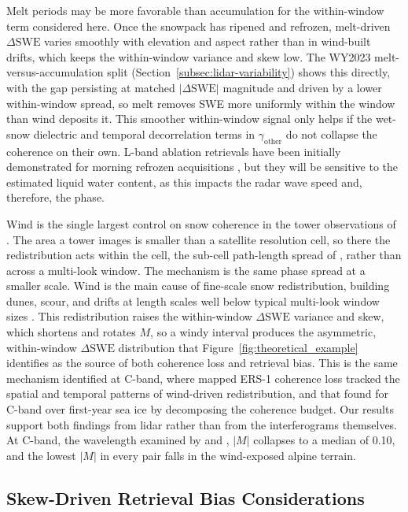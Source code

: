 \documentclass[tc, manuscript]{copernicus}
\begin{document}
Melt periods may be more favorable than accumulation for the within-window term considered here. Once the snowpack has ripened and refrozen, melt-driven $\Delta\mathrm{SWE}$ varies smoothly with elevation and aspect rather than in wind-built drifts, which keeps the within-window variance and skew low. The WY2023 melt-versus-accumulation split (Section~\ref{subsec:lidar-variability}) shows this directly, with the gap persisting at matched $|\Delta\mathrm{SWE}|$ magnitude and driven by a lower within-window spread, so melt removes SWE more uniformly within the window than wind deposits it. This smoother within-window signal only helps if the wet-snow dielectric and temporal decorrelation terms in $\gamma_\mathrm{other}$ do not collapse the coherence on their own. L-band ablation retrievals have been initially demonstrated for morning refrozen acquisitions \citep{Tarricone2023}, but they will be sensitive to the estimated liquid water content, as this impacts the radar wave speed and, therefore, the phase.

Wind is the single largest control on snow coherence in the tower observations of \citet{Ruiz2022}. The area a tower images is smaller than a satellite resolution cell, so there the redistribution acts within the cell, the sub-cell path-length spread of \citet{Rott2003}, rather than across a multi-look window. The mechanism is the same phase spread at a smaller scale. Wind is the main cause of fine-scale snow redistribution, building dunes, scour, and drifts at length scales well below typical multi-look window sizes \citep{trujillo2007topographic-0ec}. This redistribution raises the within-window $\Delta\mathrm{SWE}$ variance and skew, which shortens and rotates $M$, so a windy interval produces the asymmetric, within-window $\Delta\mathrm{SWE}$ distribution that Figure~\ref{fig:theoretical_example} identifies as the source of both coherence loss and retrieval bias. This is the same mechanism \citet{LiSturm2002} identified at C-band, where mapped ERS-1 coherence loss tracked the spatial and temporal patterns of wind-driven redistribution, and that \citet{ming2026} found for C-band over first-year sea ice by decomposing the coherence budget. Our results support both findings from lidar rather than from the interferograms themselves. At C-band, the wavelength examined by \citet{LiSturm2002} and \citet{ming2026}, $|M|$ collapses to a median of 0.10, and the lowest $|M|$ in every pair falls in the wind-exposed alpine terrain.

\subsection{Skew-Driven Retrieval Bias Considerations}\label{subsec:phase-bias}
\end{document}
